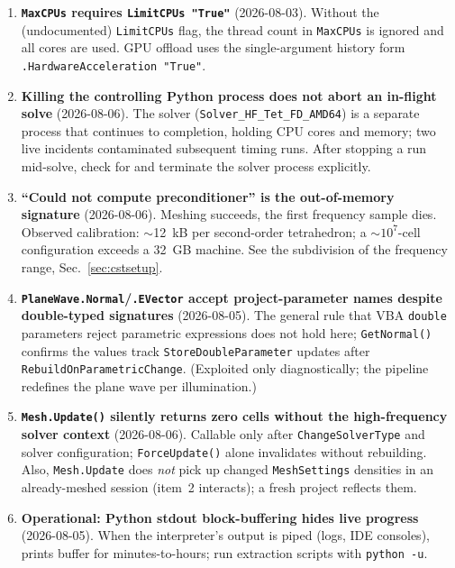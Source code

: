 \documentclass[11pt]{article}
\begin{document}
\begin{enumerate}
\item \textbf{\texttt{MaxCPUs} requires \texttt{LimitCPUs "True"}}
(2026-08-03).  Without the (undocumented) \texttt{LimitCPUs} flag, the
thread count in \texttt{MaxCPUs} is ignored and all cores are used.
GPU offload uses the single-argument history form
\texttt{.HardwareAcceleration "True"}.

\item \textbf{Killing the controlling Python process does not abort an
in-flight solve} (2026-08-06).  The solver
(\texttt{Solver\_HF\_Tet\_FD\_AMD64}) is a separate process that
continues to completion, holding CPU cores and memory; two live
incidents contaminated subsequent timing runs.  After stopping a run
mid-solve, check for and terminate the solver process explicitly.

\item \textbf{``Could not compute preconditioner'' is the
out-of-memory signature} (2026-08-06).  Meshing succeeds, the first
frequency sample dies.  Observed calibration: $\sim$12~kB per
second-order tetrahedron; a $\sim$$10^7$-cell configuration exceeds a
32~GB machine.  See the subdivision of the frequency range,
Sec.~\ref{sec:cstsetup}.

\item \textbf{\texttt{PlaneWave.Normal}/\texttt{.EVector} accept
project-parameter names despite double-typed signatures} (2026-08-05).
The general rule that VBA \texttt{double} parameters reject parametric
expressions does not hold here; \texttt{GetNormal()} confirms the
values track \texttt{StoreDoubleParameter} updates after
\texttt{RebuildOnParametricChange}.  (Exploited only diagnostically;
the pipeline redefines the plane wave per illumination.)

\item \textbf{\texttt{Mesh.Update()} silently returns zero cells
without the high-frequency solver context} (2026-08-06).  Callable
only after \texttt{ChangeSolverType} and solver configuration;
\texttt{ForceUpdate()} alone invalidates without rebuilding.  Also,
\texttt{Mesh.Update} does \emph{not} pick up changed
\texttt{MeshSettings} densities in an already-meshed session (item~2
interacts); a fresh project reflects them.

\item \textbf{Operational: Python stdout block-buffering hides live
progress} (2026-08-05).  When the interpreter's output is piped (logs,
IDE consoles), prints buffer for minutes-to-hours; run extraction
scripts with \texttt{python -u}.
\end{enumerate}
\end{document}
